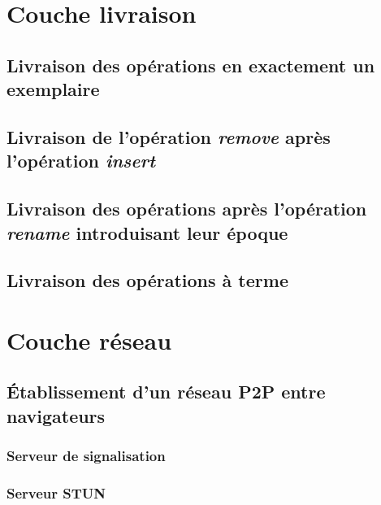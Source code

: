 \section{Couche livraison}
\label{sec:mute-livraison}



\subsection{Livraison des opérations en exactement un exemplaire}


\subsection{Livraison de l'opération \emph{remove} après l'opération \emph{insert}}


\subsection{Livraison des opérations après l'opération \emph{rename} introduisant leur époque}


\subsection{Livraison des opérations à terme}


\section{Couche réseau}


\subsection{Établissement d'un réseau \ac{P2P} entre navigateurs}


\subsubsection{Serveur de signalisation}


\subsubsection{Serveur STUN}


